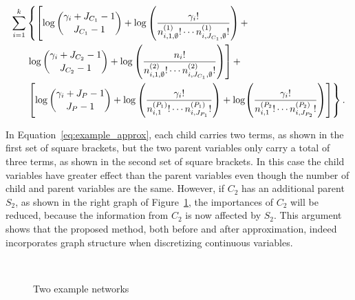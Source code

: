 \begin{small}
  \begin{equation}
  \begin{aligned}
  \label{eq:example_approx}
   \sum_{i=1}^k & \left\lbrace   \left[ \log{{\gamma_{i} + J_{C_1} - 1}\choose{J_{C_1}-1}} + \log \left(  {{{\gamma_i}!} \over { {n^{(1)}_{i,1,\emptyset} !} \cdots {n^{(1)}_{i,J_{C_1},\emptyset} !}} }  \right)  +  \right. \right.\\
  & \left.  \log{{\gamma_{i} + J_{C_2} - 1}\choose{J_{C_2}-1}} + \log \left(  {{{n_i}!} \over { {n^{(2)}_{i,1,\emptyset} !} \cdots {n^{(2)}_{i,J_{C_1},\emptyset} !}} }  \right)  \right] + \\
  &  \left. \left[  \log {{\gamma_{i} + J_P - 1}\choose{J_P-1}} +  \log \left( { {{{\gamma}_i}!}\over{ {n^{(P_1)}_{i,1} !}\cdots {n^{(P_1)}_{i,J_{P_1}} !}}} \right) +\log \paren{{ {{{\gamma}_i}!}\over{ {n^{(P_2}_{i,1} !}\cdots {n^{(P_2)}_{i,J_{P_2}} !}}} } \right] \right\rbrace \text{.}
  \end{aligned}
  \end{equation}
\end{small}

In Equation~\ref{eq:example_approx}, each child carries two terms, as shown in the first set of square brackets, but the two parent variables only carry a total of three terms, as shown in the second set of square brackets.
In this case the child variables have greater effect than the parent variables even though the number of child and parent variables are the same.
However, if $C_2$ has an additional parent $S_2$, as shown in the right graph of Figure~\ref{fig:example_networks}, the importances of $C_2$ will be reduced, because the information from $C_2$ is now affected by $S_2$.
This argument shows that the proposed method, both before and after approximation, indeed incorporates graph structure when discretizing continuous variables.

\begin{figure}[ht]
  \centering
  \begin{tabular}{cc}
    
    \end{tabular}
   \hspace{5em}
    \begin{tabular}{cc}
    
  \end{tabular}
  \caption{Two example networks}
  \label{fig:example_networks}
\end{figure}



